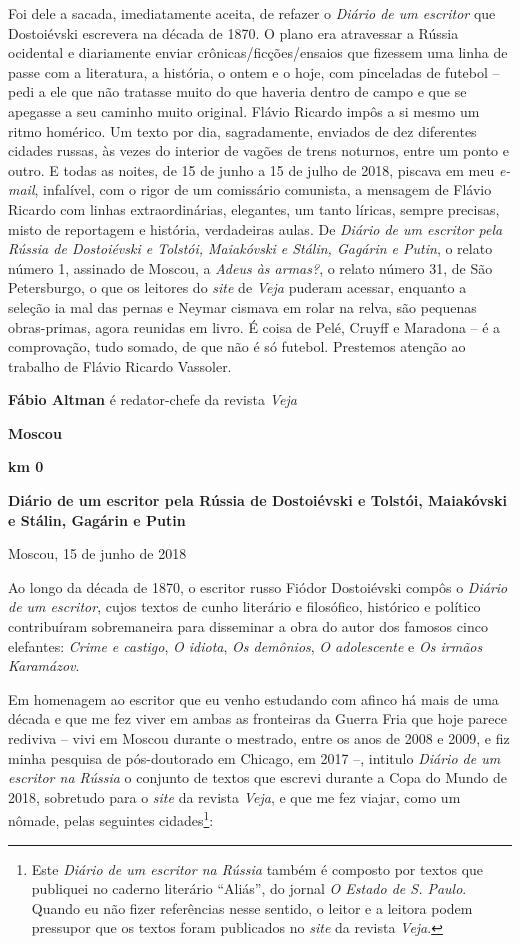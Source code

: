 Foi dele a sacada, imediatamente aceita, de refazer o \emph{Diário de um
escritor} que Dostoiévski escrevera na década de 1870. O plano era
atravessar a Rússia ocidental e diariamente enviar
crônicas/ficções/ensaios que fizessem uma linha de passe com a
literatura, a história, o ontem e o hoje, com pinceladas de futebol --
pedi a ele que não tratasse muito do que haveria dentro de campo e que
se apegasse a seu caminho muito original. Flávio Ricardo impôs a si
mesmo um ritmo homérico. Um texto por dia, sagradamente, enviados de dez
diferentes cidades russas, às vezes do interior de vagões de trens
noturnos, entre um ponto e outro. E todas as noites, de 15 de junho a 15
de julho de 2018, piscava em meu \emph{e-mail}, infalível, com o rigor
de um comissário comunista, a mensagem de Flávio Ricardo com linhas
extraordinárias, elegantes, um tanto líricas, sempre precisas, misto de
reportagem e história, verdadeiras aulas. De \emph{Diário de um escritor
pela Rússia de Dostoiévski e Tolstói, Maiakóvski e Stálin, Gagárin e
Putin}, o relato número 1, assinado de Moscou, a \emph{Adeus às armas?},
o relato número 31, de São Petersburgo, o que os leitores do \emph{site}
de \emph{Veja} puderam acessar, enquanto a seleção ia mal das pernas e
Neymar cismava em rolar na relva, são pequenas obras-primas, agora
reunidas em livro. É coisa de Pelé, Cruyff e Maradona -- é a
comprovação, tudo somado, de que não é só futebol. Prestemos atenção ao
trabalho de Flávio Ricardo Vassoler.

\textbf{Fábio Altman} é redator-chefe da revista \emph{Veja}

\textbf{Moscou}

\textbf{km 0}

\textbf{Diário de um escritor pela Rússia de Dostoiévski e Tolstói,
Maiakóvski e Stálin, Gagárin e Putin}

Moscou, 15 de junho de 2018

Ao longo da década de 1870, o escritor russo Fiódor Dostoiévski compôs o
\emph{Diário de um escritor}, cujos textos de cunho literário e
filosófico, histórico e político contribuíram sobremaneira para
disseminar a obra do autor dos famosos cinco elefantes: \emph{Crime e
castigo}, \emph{O idiota}, \emph{Os demônios}, \emph{O adolescente} e
\emph{Os irmãos Karamázov}.

Em homenagem ao escritor que eu venho estudando com afinco há mais de
uma década e que me fez viver em ambas as fronteiras da Guerra Fria que
hoje parece rediviva -- vivi em Moscou durante o mestrado, entre os anos
de 2008 e 2009, e fiz minha pesquisa de pós-doutorado em Chicago, em
2017 --, intitulo \emph{Diário de um escritor na Rússia} o conjunto de
textos que escrevi durante a Copa do Mundo de 2018, sobretudo para o
\emph{site} da revista \emph{Veja}, e que me fez viajar, como um nômade,
pelas seguintes cidades\footnote{Este \emph{Diário de um escritor na
  Rússia} também é composto por textos que publiquei no caderno
  literário ``Aliás'', do jornal \emph{O Estado de S. Paulo}. Quando eu
  não fizer referências nesse sentido, o leitor e a leitora podem
  pressupor que os textos foram publicados no \emph{site} da revista
  \emph{Veja}.}:

